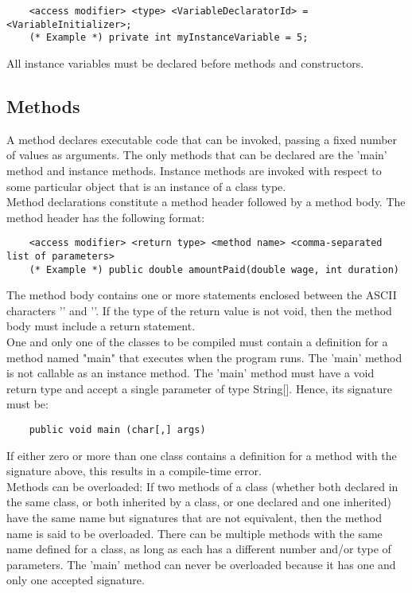 \begin{homeworkProblem}
\begin{verbatim}
	<access modifier> <type> <VariableDeclaratorId> = <VariableInitializer>;
	(* Example *) private int myInstanceVariable = 5;
	\end{verbatim}

	All instance variables must be declared before methods and constructors. 
	
	\subsection{Methods}
	A method declares executable code that can be invoked, passing a fixed number of values as arguments. The only methods that can be declared are the 'main' method and instance methods. Instance methods are invoked with respect to some particular object that is an instance of a class type.\\
	
	Method declarations constitute a method header followed by a method body. The method header has the following format:
	\begin{verbatim}
	<access modifier> <return type> <method name> <comma-separated list of parameters>
	(* Example *) public double amountPaid(double wage, int duration)
	\end{verbatim}
	
	The method body contains one or more statements enclosed between the ASCII characters '\textbraceleft' and '\textbraceright'. If the type of the return value is not void, then the method body must include a return statement.\\
	
	One and only one of the classes to be compiled must contain a definition for a method named "main" that executes when the program runs. The 'main' method is not callable as an instance method. The 'main' method must have a void return type and accept a single parameter of type String[]. Hence, its signature must be:
	\begin{verbatim}
	public void main (char[,] args)
	\end{verbatim}
	
	If either zero or more than one class contains a definition for a method with the signature above, this results in a compile-time error.\\
	
	Methods can be overloaded: If two methods of a class (whether both declared in the same class, or both inherited by a class, or one declared and one inherited) have the same name but signatures that are not equivalent, then the method name is said to be overloaded. There can be multiple methods with the same name defined for a class, as long as each has a different number and/or type of parameters. The 'main' method can never be overloaded because it has one and only one accepted signature.\\
	

\end{homeworkProblem}
